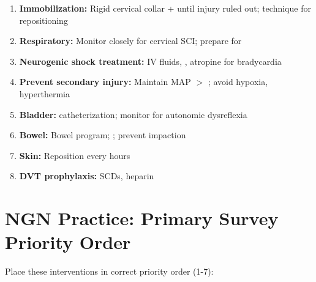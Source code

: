 \documentclass[11pt]{article}
\begin{document}
\begin{enumerate}
    \item \textbf{Immobilization:} Rigid cervical collar + \underline{\hspace{2cm}} until injury ruled out; \underline{\hspace{2cm}} technique for repositioning
    
    \item \textbf{Respiratory:} Monitor closely for cervical SCI; prepare for \underline{\hspace{2cm}}
    
    \item \textbf{Neurogenic shock treatment:} IV fluids, \underline{\hspace{2cm}}, atropine for bradycardia
    
    \item \textbf{Prevent secondary injury:} Maintain MAP $>$ \underline{\hspace{2cm}}; avoid hypoxia, hyperthermia
    
    \item \textbf{Bladder:} \underline{\hspace{3cm}} catheterization; monitor for autonomic dysreflexia
    
    \item \textbf{Bowel:} Bowel program; \underline{\hspace{2cm}}; prevent impaction
    
    \item \textbf{Skin:} Reposition every \underline{\hspace{2cm}} hours
    
    \item \textbf{DVT prophylaxis:} SCDs, \underline{\hspace{3cm}} heparin
\end{enumerate}

\hrulefill

\section{NGN Practice: Primary Survey Priority Order}

Place these interventions in correct priority order (1-7):
\end{document}

